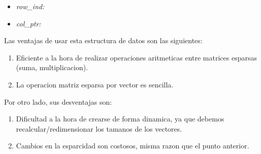 \begin{center}
\begin{itemize}
  \item \textit{row_ind:}
\end{itemize}
\end{center}

\begin{center}
\begin{itemize}
  \item \textit{col_ptr:}
\end{itemize}

\end{center}

Las ventajas de usar esta estructura de datos son las siguientes:
\begin{enumerate}
  \item Eficiente a la hora de realizar operaciones aritmeticas entre matrices esparsas (suma, multiplicacion).
  \item La operacion matriz esparsa por vector es sencilla.
\end{enumerate}
Por otro lado, sus desventajas son:
\begin{enumerate}
  \item Dificultad a la hora de crearse de forma dinamica, ya que debemos recalcular/redimensionar los tamanos de los vectores.
  \item Cambios en la esparcidad son costosos, misma razon que el punto anterior.
\end{enumerate}

